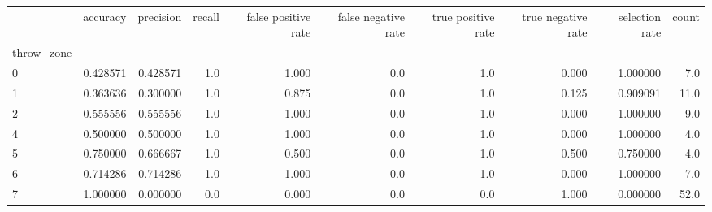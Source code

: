 \begin{tabular}{lrrrrrrrrr}
\toprule
{} &  accuracy &  precision &  recall &  false positive rate &  false negative rate &  true positive rate &  true negative rate &  selection rate &  count \\
throw\_zone &           &            &         &                      &                      &                     &                     &                 &        \\
\midrule
0          &  0.428571 &   0.428571 &     1.0 &                1.000 &                  0.0 &                 1.0 &               0.000 &        1.000000 &    7.0 \\
1          &  0.363636 &   0.300000 &     1.0 &                0.875 &                  0.0 &                 1.0 &               0.125 &        0.909091 &   11.0 \\
2          &  0.555556 &   0.555556 &     1.0 &                1.000 &                  0.0 &                 1.0 &               0.000 &        1.000000 &    9.0 \\
4          &  0.500000 &   0.500000 &     1.0 &                1.000 &                  0.0 &                 1.0 &               0.000 &        1.000000 &    4.0 \\
5          &  0.750000 &   0.666667 &     1.0 &                0.500 &                  0.0 &                 1.0 &               0.500 &        0.750000 &    4.0 \\
6          &  0.714286 &   0.714286 &     1.0 &                1.000 &                  0.0 &                 1.0 &               0.000 &        1.000000 &    7.0 \\
7          &  1.000000 &   0.000000 &     0.0 &                0.000 &                  0.0 &                 0.0 &               1.000 &        0.000000 &   52.0 \\
\bottomrule
\end{tabular}
